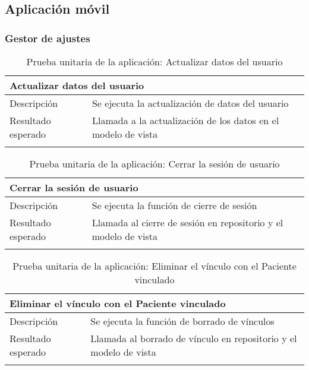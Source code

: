 \subsection{Aplicación móvil}

\subsubsection{Gestor de ajustes}

\begin{longtable}{|p{} p{}|}
    \hline
    \multicolumn{2}{|l|}{\textbf{Actualizar datos del usuario}} \\ \hline 
    Descripción                 & Se ejecuta la actualización de datos del usuario \\ \hline
    Resultado esperado          & Llamada a la actualización de los datos en el modelo de vista \\ \hline
    \caption{Prueba unitaria de la aplicación: Actualizar datos del usuario}
    \label{cp:u:app:actualizar_datos}
\end{longtable}

\begin{longtable}{|p{} p{}|}
    \hline
    \multicolumn{2}{|l|}{\textbf{Cerrar la sesión de usuario}} \\ \hline 
    Descripción                 & Se ejecuta la función de cierre de sesión \\ \hline
    Resultado esperado          & Llamada al cierre de sesión en repositorio y el modelo de vista \\ \hline
    \caption{Prueba unitaria de la aplicación: Cerrar la sesión de usuario}
    \label{cp:u:app:cerrar_sesion_usuario}
\end{longtable}

\begin{longtable}{|p{} p{}|}
    \hline
    \multicolumn{2}{|l|}{\textbf{Eliminar el vínculo con el Paciente vinculado}} \\ \hline 
    Descripción                 & Se ejecuta la función de borrado de vínculos \\ \hline
    Resultado esperado          & Llamada al borrado de vínculo en repositorio y el modelo de vista \\ \hline
    \caption{Prueba unitaria de la aplicación: Eliminar el vínculo con el Paciente vinculado}
    \label{cp:u:app:eliminar_vinculo}
\end{longtable}
    
